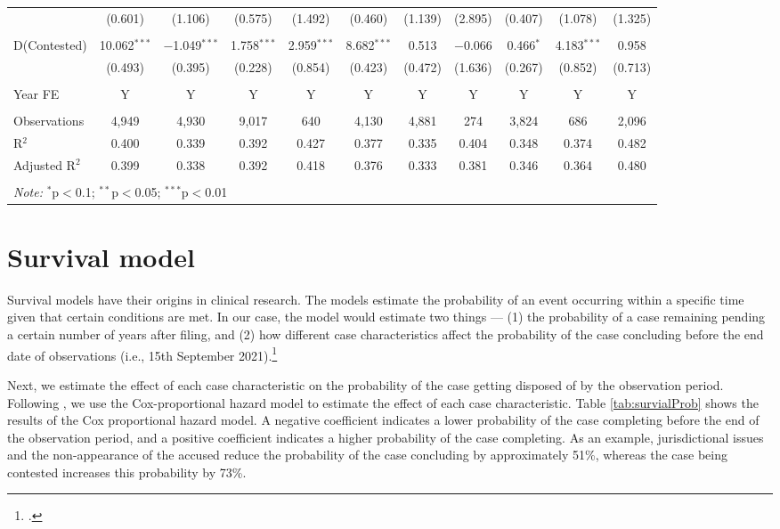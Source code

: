 \documentclass[12pt,a4paper]{article}
\begin{document}
\begin{appendices}
\begin{landscape}
\begin{table}
{\begin{tabular}{lcccccccccc}
& (0.601) & (1.106) & (0.575) & (1.492) & (0.460) & (1.139) & (2.895) & (0.407) & (1.078) & (1.325) \\
& & & & & & & & & & \\
D(Contested) & 10.062$^{***}$ & $-$1.049$^{***}$ & 1.758$^{***}$ & 2.959$^{***}$ & 8.682$^{***}$ & 0.513 & $-$0.066 & 0.466$^{*}$ & 4.183$^{***}$ & 0.958 \\
& (0.493) & (0.395) & (0.228) & (0.854) & (0.423) & (0.472) & (1.636) & (0.267) & (0.852) & (0.713) \\
\hline \\[-1.8ex]
Year FE & Y & Y & Y & Y & Y & Y & Y & Y & Y & Y \\
\hline \\[-1.8ex]
Observations & 4,949 & 4,930 & 9,017 & 640 & 4,130 & 4,881 & 274 & 3,824 & 686 & 2,096 \\
R$^{2}$ & 0.400 & 0.339 & 0.392 & 0.427 & 0.377 & 0.335 & 0.404 & 0.348 & 0.374 & 0.482 \\
Adjusted R$^{2}$ & 0.399 & 0.338 & 0.392 & 0.418 & 0.376 & 0.333 & 0.381 & 0.346 & 0.364 & 0.480 \\
\hline \\[-1.8ex]
\multicolumn{11}{l}{\textit{Note:} $^{*}$p$<$0.1; $^{**}$p$<$0.05; $^{***}$p$<$0.01} \\
\end{tabular} }
\end{table}
\end{landscape}

\newpage
\section{Survival model}
\label{sec:survivalModel}

Survival models have their origins in clinical research. The models estimate the probability of an event occurring within a specific time given that certain conditions are met. In our case, the model would estimate two things --- (1) the probability of a case remaining pending a certain number of years after filing, and (2) how different case characteristics affect the probability of the case concluding before the end date of observations (i.e., 15th September 2021).\footcite[For a prior example of the use of hazard models for empirical judicial analysis, see][]{datta2017_itatDelays}

Next, we estimate the effect of each case characteristic on the probability of the case getting disposed of by the observation period. Following \textcite{datta2017_itatDelays}, we use the Cox-proportional hazard model to estimate the effect of each case characteristic. Table \ref{tab:survialProb} shows the results of the Cox proportional hazard model. A negative coefficient indicates a lower probability of the case completing before the end of the observation period, and a positive coefficient indicates a higher probability of the case completing. As an example, jurisdictional issues and the non-appearance of the accused reduce the probability of the case concluding by approximately 51\%, whereas the case being contested increases this probability by 73\%.


\end{appendices}
\end{document}
